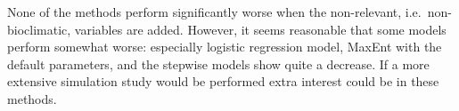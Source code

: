 None of the methods perform significantly worse when the non-relevant, i.e.\ non-bioclimatic, variables are added. However, it seems reasonable that some models perform somewhat worse: especially logistic regression model, MaxEnt with the default parameters, and the stepwise models show quite a decrease. If a more extensive simulation study would be performed extra interest could be in these methods. \\

\begin{table}[!htb]
\end{table}
